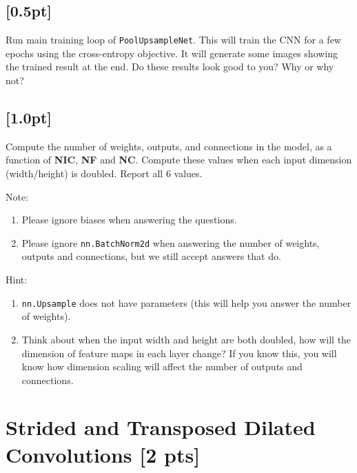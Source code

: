 \subsection{{\color{blue}[0.5pt] \LIV}}

Run main training loop of \texttt{PoolUpsampleNet}. This will train the CNN for a few epochs using the cross-entropy objective. It will generate some images showing the trained result at the end. Do these results look good to you? Why or why not?

\subsection{{\color{blue}[1.0pt] \LIII}}

Compute the number of weights, outputs, and connections in the model, as a function of \textbf{NIC}, \textbf{NF} and \textbf{NC}. Compute these values when each input dimension (width/height) is doubled. Report all 6 values. 

Note: 
\begin{enumerate}
  \item Please ignore biases when answering the questions.
  \item Please ignore \texttt{nn.BatchNorm2d} when answering the number of weights, outputs and connections, but we still accept answers that do.
\end{enumerate}

Hint: 
\begin{enumerate}
  \item \texttt{nn.Upsample} does not have parameters (this will help you answer the number of weights). 
  \item Think about when the input width and height are both doubled, how will the dimension of feature maps in each layer change? If you know this, you will know how dimension scaling will affect the number of outputs and connections.
\end{enumerate}

          
\section{Strided and Transposed Dilated Convolutions [2 pts]}

